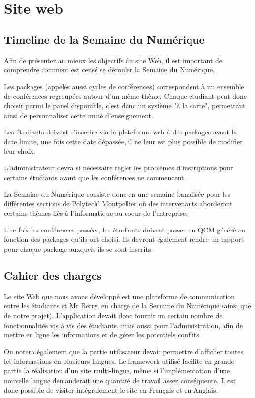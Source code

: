 \chapter{Site web}

    \section{Timeline de la Semaine du Numérique}

Afin de présenter au mieux les objectifs du site Web, il est important de comprendre
comment est censé se dérouler la Semaine du Numérique.

Les packages (appelés aussi cycles de conférences) correspondent à un ensemble de
conférences regroupées autour d'un même thème.
Chaque étudiant peut donc choisir parmi le panel disponible, c'est donc un système
"à la carte", permettant ainsi de personnaliser cette unité d'enseignement.

Les étudiants doivent s'inscrire via la plateforme web à des packages avant la date
limite, une fois cette date dépassée, il ne leur est plus possible de modifier leur choix.

L'administrateur devra si nécessaire régler les problèmes d'inscriptions pour certains
étudiants avant que les conférences ne commencent.

La Semaine du Numérique consiste donc en une semaine banalisée pour les différentes
sections de Polytech' Montpellier où des intervenants aborderont certains thèmes liés
à l'informatique au coeur de l'entreprise.

Une fois les conférences passées, les étudiants doivent passer un QCM généré en
fonction des packages qu'ils ont choisi. Ils devront également rendre un rapport
pour chaque package auxquels ils se sont inscrits.

    \section{Cahier des charges}

Le site Web que nous avons développé est une plateforme de communication entre les
étudiants et Mr Berry, en charge de la Semaine du Numérique (ainsi que de notre projet).
L'application devait donc fournir un certain nombre de fonctionnalités vis à vis
des étudiants, mais aussi pour l'administration, afin de mettre en ligne les
informations et de gérer les potentiels conflits.

On notera également que la partie utilisateur devait permettre d'afficher toutes
les informations en plusieurs langues. Le framework utilisé facilite en grande partie
la réalisation d'un site multi-lingue, même si l'implémentation d'une nouvelle
langue demanderait une quantité de travail assez conséquente. Il est donc possible
de visiter intégralement le site en Français et en Anglais.


